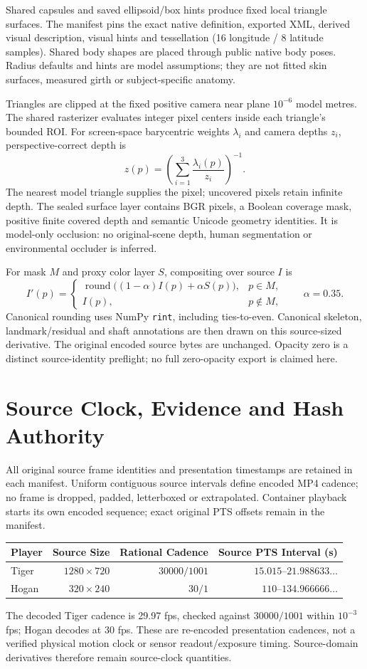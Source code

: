 \documentclass[11pt,letterpaper]{article}
\newcommand{\code}[1]{\nolinkurl{#1}}\newcommand{\hash}[1]{{\footnotesize\nolinkurl{#1}}}
\newcommand{\chapterpage}[1]{\clearpage\section{#1}}
\begin{document}
Shared capsules and saved ellipsoid/box hints produce fixed local triangle surfaces.
The manifest pins the exact native definition, exported XML, derived visual description,
visual hints and tessellation (16 longitude / 8 latitude samples). Shared body shapes
are placed through public native body poses. Radius defaults and hints are model
assumptions; they are not fitted skin surfaces, measured girth or subject-specific anatomy.

Triangles are clipped at the fixed positive camera near plane $10^{-6}$ model metres.
The shared rasterizer evaluates integer pixel centers inside each triangle's bounded ROI.
For screen-space barycentric weights $\lambda_i$ and camera depths $z_i$, perspective-correct depth is
\[
z(p)=\left(\sum_{i=1}^{3}\frac{\lambda_i(p)}{z_i}\right)^{-1}.
\]
The nearest model triangle supplies the pixel; uncovered pixels retain infinite depth.
The sealed surface layer contains BGR pixels, a Boolean coverage mask, positive finite
covered depth and semantic Unicode geometry identities. It is model-only occlusion:
no original-scene depth, human segmentation or environmental occluder is inferred.

For mask $M$ and proxy color layer $S$, compositing over source $I$ is
\[
I'(p)=\begin{cases}\operatorname{round}\bigl((1-\alpha)I(p)+\alpha S(p)\bigr),&p\in M,\\
I(p),&p\notin M,\end{cases}\qquad\alpha=0.35.
\]
Canonical rounding uses NumPy \code{rint}, including ties-to-even.
Canonical skeleton, landmark/residual and shaft annotations are then drawn on this
source-sized derivative. The original encoded source bytes are unchanged.
Opacity zero is a distinct source-identity preflight; no full zero-opacity export is claimed here.

\chapterpage{Source Clock, Evidence and Hash Authority}
All original source frame identities and presentation timestamps are retained in each
manifest. Uniform contiguous source intervals define encoded MP4 cadence; no frame
is dropped, padded, letterboxed or extrapolated. Container playback starts its own
encoded sequence; exact original PTS offsets remain in the manifest.

\begin{center}\begin{tabular}{@{}lrrr@{}}\toprule
Player & Source Size & Rational Cadence & Source PTS Interval (s)\\\midrule
Tiger & $1280\times720$ & $30000/1001$ & $15.015$--$21.988633\ldots$\\
Hogan & $320\times240$ & $30/1$ & $110$--$134.966666\ldots$\\\bottomrule
\end{tabular}\end{center}
The decoded Tiger cadence is 29.97 fps, checked against $30000/1001$ within
$10^{-3}$ fps; Hogan decodes at 30 fps. These are re-encoded presentation cadences,
not a verified physical motion clock or sensor readout/exposure timing.
Source-domain derivatives therefore remain source-clock quantities.
\end{document}
